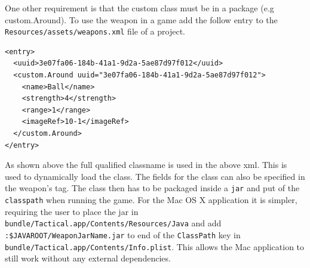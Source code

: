 One other requirement is that the custom class must be in a package (e.g custom.Around). To use the weapon in a game add the follow entry to the \texttt{Resources/assets/weapons.xml} file of a project.

\begin{lstlisting}[caption=Example of a custom weapon]
<entry>
  <uuid>3e07fa06-184b-41a1-9d2a-5ae87d97f012</uuid>
  <custom.Around uuid="3e07fa06-184b-41a1-9d2a-5ae87d97f012">
    <name>Ball</name>
    <strength>4</strength>
    <range>1</range>
    <imageRef>10-1</imageRef>
  </custom.Around>
</entry>
\end{lstlisting}

As shown above the full qualified classname is used in the above xml. This is used to dynamically load the class. The fields for the class can also be specified in the weapon's tag.  The class then has to be packaged inside a \texttt{jar} and put of the \texttt{classpath} when running the game. For the Mac OS X application it is simpler, requiring the user to place the jar in \lstinline{bundle/Tactical.app/Contents/Resources/Java} and add \texttt{:\$JAVAROOT/WeaponJarName.jar} to end of the \texttt{ClassPath} key in   \lstinline{bundle/Tactical.app/Contents/Info.plist}. This allows the Mac application to still work without any external dependencies.

